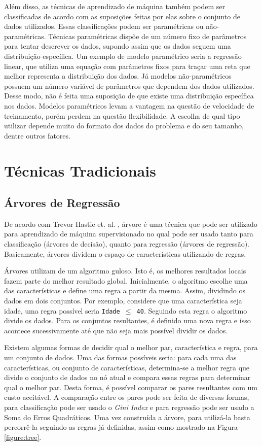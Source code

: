 Além disso, as técnicas de aprendizado de máquina também podem ser classificadas de acordo com as suposições feitas por elas sobre o conjunto de dados utilizados. Essas classificações podem ser paramétricas ou não-paramétricas. Técnicas paramétricas dispõe de um número fixo de parâmetros para tentar descrever os dados, supondo assim que os dados seguem uma distribuição específica. Um exemplo de modelo paramétrico seria a regressão linear, que utiliza uma equação com parâmetros fixos para traçar uma reta que melhor representa a distribuição dos dados. Já modelos não-paramétricos possuem um número variável de parâmetros que dependem dos dados utilizados. Desse modo, não é feita uma suposição de que existe uma distribuição específica nos dados. Modelos paramétricos levam a vantagem na questão de velocidade de treinamento, porém perdem na questão flexibilidade. A escolha de qual tipo utilizar depende muito do formato dos dados do problema e do seu tamanho, dentre outros fatores.

\section{Técnicas Tradicionais}

\subsection{Árvores de Regressão}

De acordo com Trevor Hastie et. al. \cite{hastie2005elements}, árvore é uma técnica que pode ser utilizado para aprendizado de máquina supervisionado no qual pode ser usado tanto para classificação (árvores de decisão), quanto para regressão (árvores de regressão). Basicamente, árvores dividem o espaço de características utilizando de regras.

Árvores utilizam de um algoritmo guloso. Isto é, os melhores resultados locais fazem parte do melhor resultado global. Inicialmente, o algoritmo escolhe uma das características e define uma regra a partir da mesma. Assim, dividindo os dados em dois conjuntos. Por exemplo, considere que uma característica seja idade, uma regra possível seria \texttt{Idade \(\leq\) 40}. Seguindo esta regra o algoritmo divide os dados. Para os conjuntos resultantes, é definido uma nova regra e isso acontece sucessivamente até que não seja mais possível dividir os dados.

Existem algumas formas de decidir qual o melhor par, característica e regra, para um conjunto de dados. Uma das formas possíveis seria: para cada uma das características, ou conjunto de características, determina-se a melhor regra que divide o conjunto de dados no nó atual e compara essas regras para determinar qual o melhor par. Desta forma, é possível comparar os pares resultantes com um custo aceitável. A comparação entre os pares pode ser feita de diversas formas, para classificação pode ser usado o \textit{Gini Index} e para regressão pode ser usado a Soma do Erros Quadráticos. Uma vez construída a árvore, para utilizá-la basta percorrê-la seguindo as regras já definidas, assim como mostrado na Figura \ref{figure:tree}.

